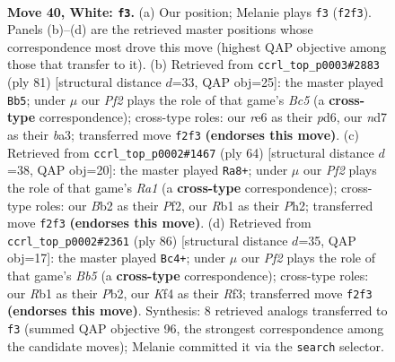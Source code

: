 \documentclass[11pt]{article}
\begin{document}
\clearpage

\begin{figure}[p]\centering
\begin{subfigure}{0.46\textwidth}\centering
\resizebox{\linewidth}{!}{%
\newchessgame
\chessboard[
  setfen={8/3n1k2/4r3/8/p1p1pK2/P1P3Pp/1BP2P1P/1R6 w - - 13 40},
  showmover=false,
  pgfstyle=straightmove, color=movearrow, markmove={f2-f3}
]}
\caption{}
\end{subfigure}\hfill
\begin{subfigure}{0.46\textwidth}\centering
\resizebox{\linewidth}{!}{%
\newchessgame
\chessboard[
  setfen={8/4Pk2/3P1pp1/5p1p/2b2P1P/Bp6/5KP1/8 b - - 0 41},
  showmover=false,
  pgfstyle=straightmove, color=movearrow, markmove={c4-b5}
]}
\caption{}
\end{subfigure}
\\[4pt]
\begin{subfigure}{0.46\textwidth}\centering
\resizebox{\linewidth}{!}{%
\newchessgame
\chessboard[
  setfen={6k1/6b1/8/3r1ppp/3P4/1p2B1P1/1P3P1P/R5K1 w - - 0 33},
  showmover=false,
  pgfstyle=straightmove, color=movearrow, markmove={a1-a8}
]}
\caption{}
\end{subfigure}\hfill
\begin{subfigure}{0.46\textwidth}\centering
\resizebox{\linewidth}{!}{%
\newchessgame
\chessboard[
  setfen={7b/4r3/1p2k1p1/1B4p1/P2P1pP1/3K1R1P/1P6/8 w - - 1 44},
  showmover=false,
  pgfstyle=straightmove, color=movearrow, markmove={b5-c4}
]}
\caption{}
\end{subfigure}
\caption{\textbf{Move 40, White: \texttt{f3}.} (a) Our position; Melanie plays \texttt{f3} (\texttt{f2f3}). Panels (b)--(d) are the retrieved master positions whose correspondence most drove this move (highest QAP objective among those that transfer to it). (b) Retrieved from \texttt{ccrl\_top\_p0003\#2883} (ply 81) [structural distance $d$=33, QAP obj=25]: the master played \texttt{Bb5}; under $\mu$ our \emph{Pf2} plays the role of that game's \emph{Bc5} (a \textbf{cross-type} correspondence); cross-type roles: our \emph{r}e6 as their \emph{p}d6, our \emph{n}d7 as their \emph{b}a3; transferred move \texttt{f2f3} \textbf{(endorses this move)}. (c) Retrieved from \texttt{ccrl\_top\_p0002\#1467} (ply 64) [structural distance $d$=38, QAP obj=20]: the master played \texttt{Ra8+}; under $\mu$ our \emph{Pf2} plays the role of that game's \emph{Ra1} (a \textbf{cross-type} correspondence); cross-type roles: our \emph{B}b2 as their \emph{P}f2, our \emph{R}b1 as their \emph{P}h2; transferred move \texttt{f2f3} \textbf{(endorses this move)}. (d) Retrieved from \texttt{ccrl\_top\_p0002\#2361} (ply 86) [structural distance $d$=35, QAP obj=17]: the master played \texttt{Bc4+}; under $\mu$ our \emph{Pf2} plays the role of that game's \emph{Bb5} (a \textbf{cross-type} correspondence); cross-type roles: our \emph{R}b1 as their \emph{P}b2, our \emph{K}f4 as their \emph{R}f3; transferred move \texttt{f2f3} \textbf{(endorses this move)}. Synthesis: 8 retrieved analogs transferred to \texttt{f3} (summed QAP objective 96, the strongest correspondence among the candidate moves); Melanie committed it via the \texttt{search} selector.}
\label{fig:thought-m78}
\end{figure}
\end{document}
